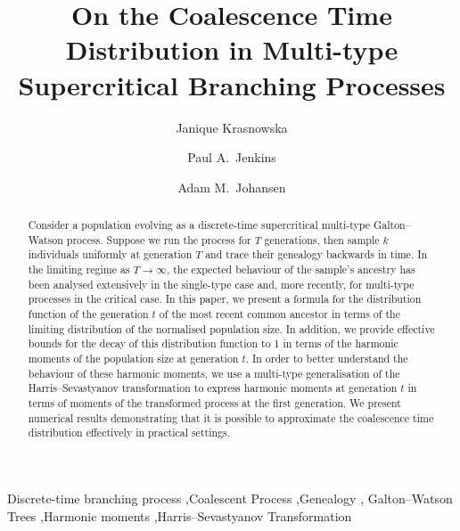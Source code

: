 \documentclass[preprint,3p,12pt]{elsarticle}
\theoremstyle{definition}
\begin{document}
\begin{frontmatter}

\title{On the Coalescence Time Distribution in Multi-type Supercritical Branching Processes}

\author[warwick]{Janique Krasnowska} 
\author[warwick,warwick-cs]{Paul A.\ Jenkins}
\author[warwick]{Adam M.\ Johansen}


\begin{abstract}
Consider a population evolving as a discrete-time supercritical multi-type Galton--Watson process. Suppose we run the process for $T$ generations, then sample $k$ individuals uniformly at generation $T$ and trace their genealogy backwards in time. In the limiting regime as $T \rightarrow \infty$, the expected behaviour of the sample's ancestry has been analysed extensively in the single-type case and, more recently, for multi-type processes in the critical case. In this paper, we present a formula for the distribution function of the generation $t$ of the most recent common ancestor in terms of the limiting distribution of the normalised population size. In addition, we provide effective bounds for the decay of this distribution function to 1 in terms of the harmonic moments of the population size at generation $t$. 
In order to better understand the behaviour of these harmonic moments, we use a multi-type generalisation of the Harris--Sevastyanov transformation to express harmonic moments at generation $t$ in terms of moments of the transformed process at the first generation. We present numerical results demonstrating that it is possible to approximate the coalescence time distribution effectively in practical settings.
\end{abstract}
 
\begin{keyword}
Discrete-time branching process \sep Coalescent Process \sep Genealogy \sep 
Galton--Watson Trees \sep Harmonic moments \sep Harris--Sevastyanov Transformation 
\end{keyword}

\end{frontmatter}
\end{document}
